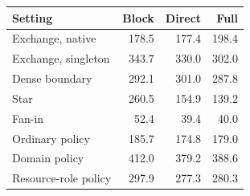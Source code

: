 \begin{tabular}{lrrr}
\toprule
Setting & Block & Direct & Full\\
\midrule
Exchange, native & 178.5 & 177.4 & 198.4\\
Exchange, singleton & 343.7 & 330.0 & 302.0\\
Dense boundary & 292.1 & 301.0 & 287.8\\
Star & 260.5 & 154.9 & 139.2\\
Fan-in & 52.4 & 39.4 & 40.0\\
Ordinary policy & 185.7 & 174.8 & 179.0\\
Domain policy & 412.0 & 379.2 & 388.6\\
Resource-role policy & 297.9 & 277.3 & 280.3\\
\bottomrule
\end{tabular}
